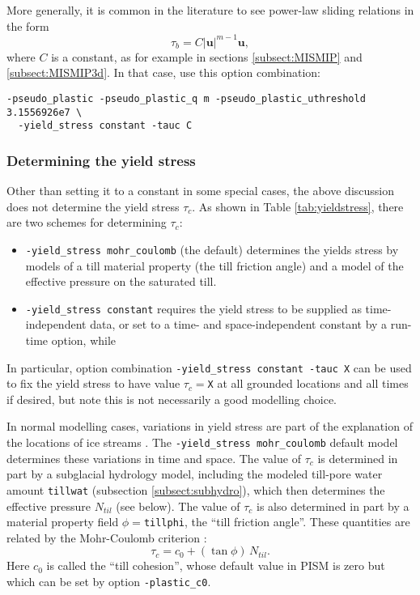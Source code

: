More generally, it is common in the literature to see power-law sliding relations in the form
    $$\tau_b = C |\mathbf{u}|^{m-1} \mathbf{u},$$
where $C$ is a constant, as for example in sections \ref{subsect:MISMIP} and \ref{subsect:MISMIP3d}.  In that case, use this option combination:
\begin{verbatim}
-pseudo_plastic -pseudo_plastic_q m -pseudo_plastic_uthreshold 3.1556926e7 \
  -yield_stress constant -tauc C
\end{verbatim}

\subsubsection*{Determining the yield stress}  Other than setting it to a constant in some special cases, the above discussion does not determine the yield stress $\tau_c$.  As shown in Table \ref{tab:yieldstress}, there are two schemes for determining $\tau_c$:\begin{itemize}
\item \texttt{-yield_stress mohr_coulomb} (the default) determines the yields stress by models of a till material property (the till friction angle) and a model of the effective pressure on the saturated till.
\item \texttt{-yield_stress constant} requires the yield stress to be supplied as time-independent data, or set to a time- and space-independent constant by a run-time option, while
\end{itemize}
In particular, option combination \texttt{-yield_stress constant -tauc X} can be used to fix the yield stress to have value $\tau_c=$\texttt{X} at all grounded locations and all times if desired, but note this is not necessarily a good modelling choice.

In normal modelling cases, variations in yield stress are part of the explanation of the locations of ice streams \cite{SchoofStream}.  The \texttt{-yield_stress mohr_coulomb} default model determines these variations in time and space.  The value of $\tau_c$ is determined in part by a subglacial hydrology model, including the modeled till-pore water amount \texttt{tillwat} (subsection \ref{subsect:subhydro}), which then determines the effective pressure $N_{til}$ (see below).  The value of $\tau_c$ is also determined in part by a material property field $\phi=$\texttt{tillphi}, the ``till friction angle''.  These quantities are related by the Mohr-Coulomb criterion \cite{CuffeyPaterson}:
\begin{equation}
   \tau_c = c_{0} + (\tan\phi)\,N_{til}.  \label{eq:mohrcoulomb}
\end{equation}
Here $c_0$ is called the ``till cohesion'', whose default value in PISM is zero \cite[formula (2.4)]{SchoofStream} but which can be set by option \texttt{-plastic_c0}.

